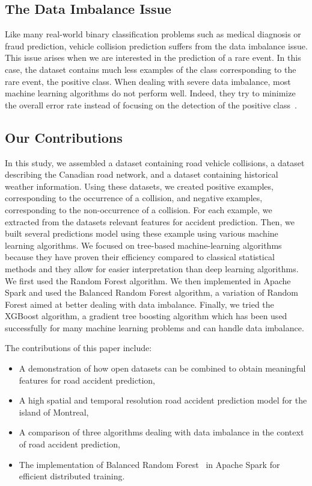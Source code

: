 \documentclass[conference]{IEEEtran}
\begin{document}
\subsection{The Data Imbalance Issue}

Like many real-world binary classification problems such as medical diagnosis or fraud prediction, vehicle collision prediction suffers from the data imbalance issue. This issue arises when we are interested in the prediction of a rare event. In this case, the dataset contains much less examples of the class corresponding to the rare event, the positive class. When dealing with severe data imbalance, most machine learning algorithms do not perform well. Indeed, they try to minimize the overall error rate instead of focusing on the detection of the positive class~\cite{Chen2004}.


\subsection{Our Contributions}

In this study, we assembled a dataset containing road vehicle collisions, a dataset describing the Canadian road network, and a dataset containing historical weather information. Using these datasets, we created positive examples, corresponding to the occurrence of a collision, and negative examples, corresponding to the non-occurrence of a collision. For each example, we extracted from the datasets relevant features for accident prediction. Then, we built several predictions model using these example using various machine learning algorithms. We focused on tree-based machine-learning algorithms because they have proven their efficiency compared to classical statistical methods \cite{Chang2005, Chang2005b} and they allow for easier interpretation than deep learning algorithms. We first used the Random Forest algorithm. We then implemented in Apache Spark and used the Balanced Random Forest algorithm\cite{Chen2004}, a variation of Random Forest aimed at better dealing with data imbalance. Finally, we  tried the XGBoost algorithm\cite{TChen2016}, a gradient tree boosting algorithm which has been used successfully for many machine learning problems and can handle data imbalance\cite{xgboost_doc}.

The contributions of this paper include: 
\begin{itemize}
\item A demonstration of how open datasets can be combined to obtain
meaningful features for road accident prediction,
\item A high spatial and temporal resolution road accident prediction model for the island of Montreal,
\item A comparison of three algorithms dealing with data imbalance in the context of road accident prediction,
\item The implementation of Balanced Random Forest~\cite{Chen2004} in Apache Spark for efficient distributed training.
\end{itemize}
\end{document}
